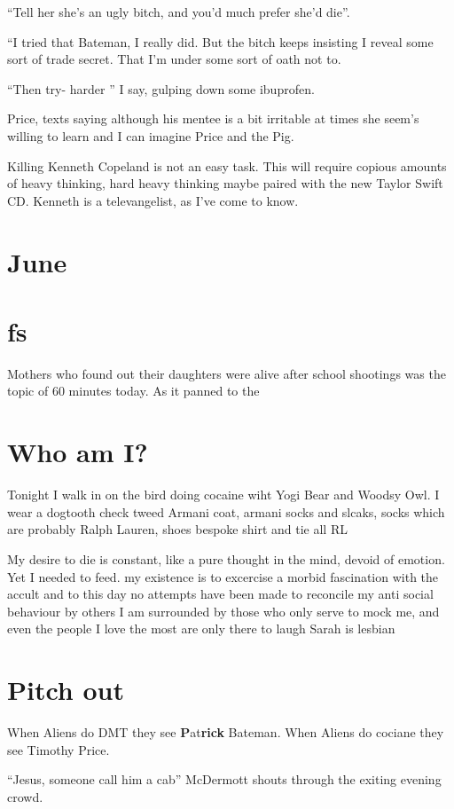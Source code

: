 \documentclass[19pt,openany]{book}
\begin{document}
``Tell her she's an ugly bitch, and you'd much prefer she'd die''.

``I tried that Bateman, I really did. But the bitch keeps insisting I reveal
some sort of trade secret. That I'm under some sort of oath not to.

``Then try- harder '' I say, gulping down some ibuprofen.

Price, texts saying although his mentee is a bit irritable at times she seem's willing to learn
and I can imagine Price and the Pig.

Killing Kenneth Copeland is not an easy task. This will require copious amounts of heavy
thinking, hard heavy thinking maybe paired with the new Taylor Swift CD. Kenneth
is a televangelist, as I've come to know.

\chapter{June}

\chapter{fs}
Mothers who found out their daughters were
alive after school shootings was the topic
of 60 minutes today. As it panned to the

\chapter{Who am I?}
Tonight I walk in on the bird doing cocaine wiht Yogi Bear
and Woodsy Owl. I wear a dogtooth check tweed Armani coat, armani
socks and slcaks, socks which are probably Ralph Lauren, shoes bespoke shirt and tie all RL

My desire to die is constant, like a pure thought in
the mind, devoid of emotion. Yet I needed to feed.
my existence is to excercise a morbid fascination with the accult and to this day no attempts have been made to reconcile my anti social behaviour by others
I am surrounded by those who only serve to mock
me, and even the people I love the most are only
there to laugh
Sarah is lesbian
\chapter{Pitch out}
When Aliens do DMT they see \textbf{P}at\textbf{rick} Bateman.
When Aliens do cociane they see Timothy Price.

``Jesus, someone call him a cab'' McDermott shouts through
the exiting evening crowd.
\end{document}
